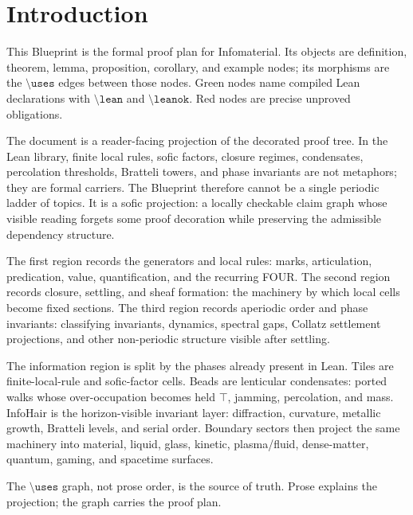 \chapter{Introduction}
\label{ch:intro}

This Blueprint is the formal proof plan for Infomaterial.  Its objects are
definition, theorem, lemma, proposition, corollary, and example nodes; its
morphisms are the \(\texttt{\textbackslash uses}\) edges between those nodes.
Green nodes name compiled Lean declarations with \(\texttt{\textbackslash lean}\)
and \(\texttt{\textbackslash leanok}\).  Red nodes are precise unproved
obligations.

The document is a reader-facing projection of the decorated proof tree.  In the
Lean library, finite local rules, sofic factors, closure regimes, condensates,
percolation thresholds, Bratteli towers, and phase invariants are not metaphors;
they are formal carriers.  The Blueprint therefore cannot be a single periodic
ladder of topics.  It is a sofic projection: a locally checkable claim graph
whose visible reading forgets some proof decoration while preserving the
admissible dependency structure.

The first region records the generators and local rules: marks, articulation,
predication, value, quantification, and the recurring FOUR.  The second region
records closure, settling, and sheaf formation: the machinery by which local
cells become fixed sections.  The third region records aperiodic order and phase
invariants: classifying invariants, dynamics, spectral gaps, Collatz settlement
projections, and other non-periodic structure visible after settling.

The information region is split by the phases already present in Lean.
Tiles are finite-local-rule and sofic-factor cells.  Beads are lenticular
condensates: ported walks whose over-occupation becomes held
\(\top\), jamming, percolation, and mass.  InfoHair is the horizon-visible
invariant layer: diffraction, curvature, metallic growth, Bratteli levels, and
serial order.  Boundary sectors then project the same machinery into material,
liquid, glass, kinetic, plasma/fluid, dense-matter, quantum, gaming, and
spacetime surfaces.

The \(\texttt{\textbackslash uses}\) graph, not prose order, is the source of
truth.  Prose explains the projection; the graph carries the proof plan.
